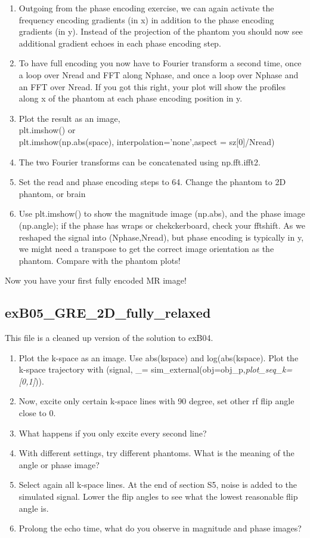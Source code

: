 \documentclass[a4paper,12pt]{extarticle}
\begin{document}
\begin{enumerate}
\item  Outgoing from the phase encoding exercise, we can again activate the frequency encoding gradients (in x) in addition to the phase encoding gradients (in y). Instead of the projection of the phantom you should now see additional gradient echoes in each phase encoding step.
\item To have full encoding you now have to Fourier transform a second time, once a loop over Nread and FFT along Nphase, and once a loop over Nphase  and an FFT over Nread. If you got this right, your plot will show the profiles along x of the phantom at each phase encoding position in y.
\item Plot the result as an image, \\plt.imshow()  or \\ plt.imshow(np.abs(space), interpolation='none',aspect = sz[0]/Nread)

\item The two Fourier transforms can be concatenated using np.fft.ifft2. 
\item Set the read and phase encoding steps to 64. Change the phantom to 2D phantom, or brain 
\item Use plt.imshow() to show the magnitude image (np.abs), and the phase image (np.angle); if the phase has wraps or chekckerboard, check your fftshift. As we reshaped the signal into (Nphase,Nread), but phase encoding is typically in y, we might need a transpose to get the correct image orientation as the phantom. Compare with the phantom plots!
\end{enumerate}
Now you have your first fully encoded MR image!


\subsection{exB05\_GRE\_2D\_fully\_relaxed}
This file is a cleaned up version of the solution to exB04.
\begin{enumerate}
\item Plot the k-space as an image. Use abs(kspace) and log(abs(kspace). Plot the k-space trajectory with (signal, \_= sim\_external(obj=obj\_p,\emph{plot\_seq\_k=[0,1]})).
\item Now, excite only certain k-space lines with 90 degree, set other rf flip angle close to 0.
\item What happens if you only excite every second line?

\item With different settings, try different phantoms. What is the meaning of the angle or phase image?
\item Select again all k-space lines. At the end of section S5, noise is added to the simulated signal. Lower the flip angles to see what the lowest reasonable flip angle is. 
\item Prolong the echo time, what do you observe in magnitude and phase images?
\end{enumerate}
\end{document}
